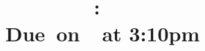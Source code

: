 \documentclass{article}
\title{
    \vspace{2in}
    \textmd{\textbf{\hmwkClass:\ \hmwkTitle}}\\
    \normalsize\vspace{0.1in}\small{Due\ on\ \hmwkDueDate\ at 3:10pm}\\
    \vspace{0.1in}\large{\textit{\hmwkClassInstructor\ \hmwkClassTime}}
    \vspace{3in}
}
\author{\hmwkAuthorName}
\date{}
\begin{document}
\maketitle

\pagebreak



\pagebreak





\pagebreak



\pagebreak



\pagebreak
\end{document}
